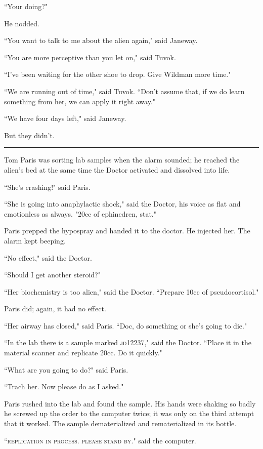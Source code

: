 \documentclass[twoside,letterpaper,12pt]{memoir}
\begin{document}
``Your doing?" 

He nodded. 

``You want to talk to me about the alien again," said Janeway. 

``You are more perceptive than you let on," said Tuvok. 

``I've been waiting for the other shoe to drop. Give Wildman more time." 

``We are running out of time," said Tuvok. ``Don't assume that, if we do learn something from her, we can apply it right away." 

``We have four days left," said Janeway. 

But they didn't. 

\begin{center}\rule{3cm}{0.4 pt}\end{center} 

Tom Paris was sorting lab samples when the alarm sounded; he reached the alien's bed at the same time the Doctor activated and dissolved into life. 

``She's crashing!" said Paris. 

``She is going into anaphylactic shock," said the Doctor, his voice as flat and emotionless as always. "20cc of ephinedren, stat." 

Paris prepped the hypospray and handed it to the doctor. He injected her. The alarm kept beeping. 

``No effect," said the Doctor. 

``Should I get another steroid?" 

``Her biochemistry is too alien," said the Doctor. ``Prepare 10cc of pseudocortisol." 

Paris did; again, it had no effect. 

``Her airway has closed," said Paris. ``Doc, do something or she's going to die." 

``In the lab there is a sample marked \textsc{jd12237}," said the Doctor. ``Place it in the material scanner and replicate 20cc. Do it quickly." 

``What are you going to do?" said Paris. 

``Trach her. Now please do as I asked." 

Paris rushed into the lab and found the sample. His hands were shaking so badly he screwed up the order to the computer twice; it was only on the third attempt that it worked. The sample dematerialized and rematerialized in its bottle. 

``\textsc{replication in process. please stand by}." said the computer. 
\end{document}
